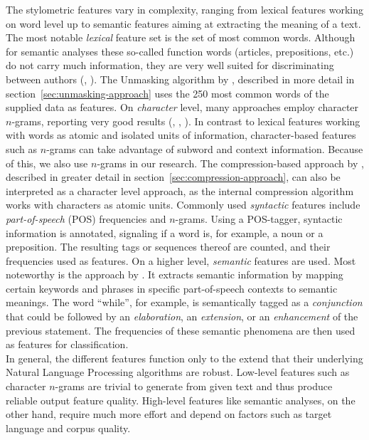 The stylometric features vary in complexity, ranging from lexical features working on word level up to semantic features aiming at extracting the meaning of a text.
The most notable \textit{lexical} feature set is the set of most common words.
Although for semantic analyses these so-called function words (articles, prepositions, etc.) do not carry much information, they are very well suited for discriminating between authors (\cite{argamon2005measuring}, \cite{burrows1987word}).
The Unmasking algorithm by \cite{koppel2004unmasking}, described in more detail in section~\ref{sec:unmasking-approach} uses the 250 most common words of the supplied data as features.
On \textit{character} level, many approaches employ character $n$-grams, reporting very good results (\cite{peng2003language}, \cite{kevselj2003n}, \cite{stamatatos2006ensemble}).
In contrast to lexical features working with words as atomic and isolated units of information, character-based features such as $n$-grams can take advantage of subword and context information.
Because of this, we also use $n$-grams in our research.
The compression-based approach by \cite{teahan2003compression}, described in greater detail in section~\ref{sec:compression-approach}, can also be interpreted as a character level approach, as the internal compression algorithm works with characters as atomic units.
Commonly used \textit{syntactic} features include \textit{part-of-speech} (POS) frequencies and $n$-grams.
Using a POS-tagger, syntactic information is annotated, signaling if a word is, for example, a noun or a preposition.
The resulting tags or sequences thereof are counted, and their frequencies used as features.
On a higher level, \textit{semantic} features are used.
Most noteworthy is the approach by \cite{argamon2007stylistic}.
It extracts semantic information by mapping certain keywords and phrases in specific part-of-speech contexts to semantic meanings.
The word ``while'', for example, is semantically tagged as a \textit{conjunction} that could be followed by an \textit{elaboration}, an \textit{extension}, or an \textit{enhancement} of the previous statement.
The frequencies of these semantic phenomena are then used as features for classification.\\
In general, the different features function only to the extend that their underlying Natural Language Processing algorithms are robust.
Low-level features such as character $n$-grams are trivial to generate from given text and thus produce reliable output feature quality.
High-level features like semantic analyses, on the other hand, require much more effort and depend on factors such as target language and corpus quality.\\
